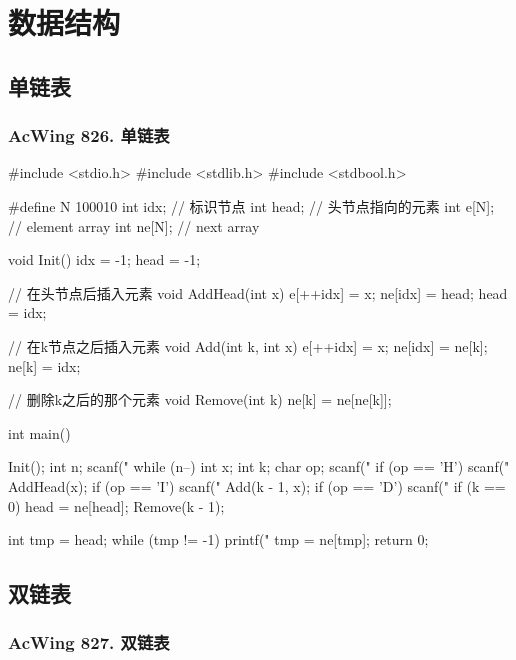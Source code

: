 \chapter{数据结构}

\section{单链表}
\subsection{AcWing 826. 单链表}

\begin{mycpptwocol}
#include <stdio.h>
#include <stdlib.h>
#include <stdbool.h>

#define N 100010
int idx; // 标识节点
int head; // 头节点指向的元素
int e[N]; // element array
int ne[N]; // next array

void Init()
{
    idx = -1;
    head = -1;
}
    
// 在头节点后插入元素
void AddHead(int x) {
    e[++idx] = x;
    ne[idx] = head;
    head = idx;
}

// 在k节点之后插入元素
void Add(int k, int x)
{
    e[++idx] = x;
    ne[idx] = ne[k];
    ne[k] = idx;
}

// 删除k之后的那个元素
void Remove(int k) {
    ne[k] = ne[ne[k]];
}

int main()
{
    Init();
    int n;
    scanf("%
    while (n--) {
        int x;
        int k;
        char op;
        scanf(" %
        if (op == 'H') {
            scanf("%
            AddHead(x);
        }
        if (op == 'I') {
            scanf("%
            Add(k - 1, x);
        }
        if (op == 'D') {
            scanf("%
            if (k == 0) {
                head = ne[head];
            }
            Remove(k - 1);
        }
    }

    int tmp = head;
    while (tmp != -1) {
        printf("%
        tmp = ne[tmp];
    }
    return 0;
}
\end{mycpptwocol}

\section{双链表}

\subsection{AcWing 827. 双链表}



